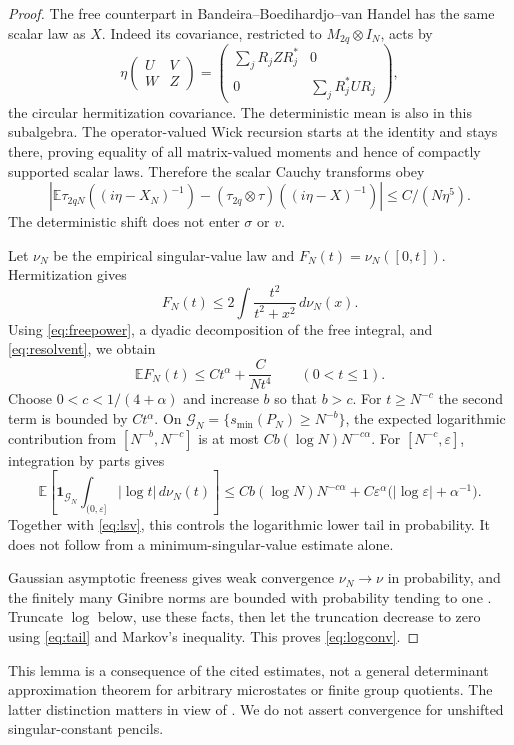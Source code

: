 \documentclass[11pt]{article}
\newcommand{\E}{\mathbb E}
\begin{document}
\begin{proof}
The free counterpart in Bandeira--Boedihardjo--van Handel \cite[Theorem 2.8]{bbvh} has the same scalar law as $X$. Indeed its covariance, restricted to $M_{2q}\otimes I_N$, acts by
\begin{equation}\label{eq:covariance}
 \eta\begin{pmatrix}U&V\\W&Z\end{pmatrix}
 =\begin{pmatrix}\sum_jR_j ZR_j^*&0\\0&\sum_jR_j^*UR_j\end{pmatrix},
\end{equation}
the circular hermitization covariance. The deterministic mean is also in this subalgebra. The operator-valued Wick recursion starts at the identity and stays there, proving equality of all matrix-valued moments and hence of compactly supported scalar laws. Therefore the scalar Cauchy transforms obey
\begin{equation}\label{eq:resolvent}
 |\E\tau_{2qN}((i\eta-X_N)^{-1})-(\tau_{2q}\otimes\tau)((i\eta-X)^{-1})|
 \le C/(N\eta^5).
\end{equation}
The deterministic shift does not enter $\sigma$ or $v$.

Let $\nu_N$ be the empirical singular-value law and $F_N(t)=\nu_N([0,t])$. Hermitization gives
\[
 F_N(t)\le2\int\frac{t^2}{t^2+x^2}\,d\nu_N(x).
\]
Using \eqref{eq:freepower}, a dyadic decomposition of the free integral, and \eqref{eq:resolvent}, we obtain
\begin{equation}\label{eq:meso}
 \E F_N(t)\le Ct^\alpha+\frac{C}{Nt^4}\qquad(0<t\le1).
\end{equation}
Choose $0<c<1/(4+\alpha)$ and increase $b$ so that $b>c$. For $t\ge N^{-c}$ the second term is bounded by $Ct^\alpha$. On $\mathcal G_N=\{s_{\min}(P_N)\ge N^{-b}\}$, the expected logarithmic contribution from $[N^{-b},N^{-c}]$ is at most $Cb(\log N)N^{-c\alpha}$. For $[N^{-c},\varepsilon]$, integration by parts gives
\begin{equation}\label{eq:tail}
 \E\left[\mathbf1_{\mathcal G_N}\int_{(0,\varepsilon]}|\log t|\,d\nu_N(t)\right]
 \le Cb(\log N)N^{-c\alpha}
 +C\varepsilon^\alpha\bigl(|\log\varepsilon|+\alpha^{-1}\bigr).
\end{equation}
Together with \eqref{eq:lsv}, this controls the logarithmic lower tail in probability. It does not follow from a minimum-singular-value estimate alone.

Gaussian asymptotic freeness gives weak convergence $\nu_N\to\nu$ in probability, and the finitely many Ginibre norms are bounded with probability tending to one \cite{han}. Truncate $\log$ below, use these facts, then let the truncation decrease to zero using \eqref{eq:tail} and Markov's inequality. This proves \eqref{eq:logconv}.
\end{proof}
This lemma is a consequence of the cited estimates, not a general determinant approximation theorem for arbitrary microstates or finite group quotients. The latter distinction matters in view of \cite{kammeyer}. We do not assert convergence for unshifted singular-constant pencils.
\end{document}
